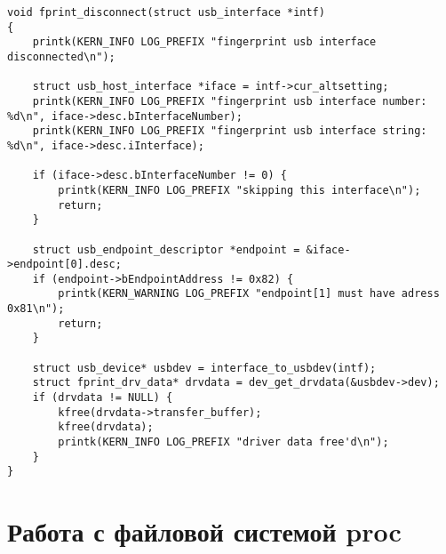 \begin{lstlisting}[caption={функция \texttt{disconnect} драйвера}]
void fprint_disconnect(struct usb_interface *intf)
{
    printk(KERN_INFO LOG_PREFIX "fingerprint usb interface disconnected\n");

    struct usb_host_interface *iface = intf->cur_altsetting;
    printk(KERN_INFO LOG_PREFIX "fingerprint usb interface number: %d\n", iface->desc.bInterfaceNumber);
    printk(KERN_INFO LOG_PREFIX "fingerprint usb interface string: %d\n", iface->desc.iInterface);

    if (iface->desc.bInterfaceNumber != 0) {
        printk(KERN_INFO LOG_PREFIX "skipping this interface\n");
        return;
    }

    struct usb_endpoint_descriptor *endpoint = &iface->endpoint[0].desc;
    if (endpoint->bEndpointAddress != 0x82) {
        printk(KERN_WARNING LOG_PREFIX "endpoint[1] must have adress 0x81\n");
        return;
    }

    struct usb_device* usbdev = interface_to_usbdev(intf);
    struct fprint_drv_data* drvdata = dev_get_drvdata(&usbdev->dev);
    if (drvdata != NULL) {
        kfree(drvdata->transfer_buffer);
        kfree(drvdata);
        printk(KERN_INFO LOG_PREFIX "driver data free'd\n");
    }
}
\end{lstlisting}

\clearpage

\section{Работа с файловой системой proc}

